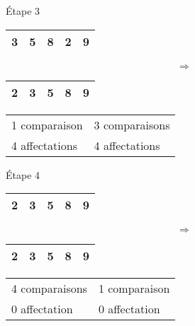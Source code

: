 \documentclass[10pt,fleqn]{article} %
\begin{document}
\begin{minipage}[b]{.1\linewidth}
Étape 3
\end{minipage}\hfill
\begin{minipage}[b]{.2\linewidth}
\begin{tabular}{|c|c|c|c|c|}
\hline
\cellcolor{black!10}3 & \cellcolor{black!10}5 & \cellcolor{black!10}8 & \cellcolor{black!30}2 & 9 \\
\hline
\end{tabular}
\end{minipage}\hfill
\begin{minipage}[b]{.1\linewidth}
$$
\Longrightarrow
$$
\end{minipage}\hfill
\begin{minipage}[b]{.2\linewidth}
\begin{tabular}{|c|c|c|c|c|}
\hline
\cellcolor{black!30}2 & \cellcolor{black!10}3 & \cellcolor{black!10}5 & \cellcolor{black!10}8 & 9 \\
\hline
\end{tabular}
\end{minipage}\hfill
\begin{minipage}[b]{.2\linewidth}
\begin{tabular}{ll}
1 comparaison & 3 comparaisons \\
4 affectations & 4 affectations \\
\end{tabular}
\end{minipage}


\begin{minipage}[b]{.1\linewidth}
Étape 4
\end{minipage}\hfill
\begin{minipage}[b]{.2\linewidth}
\begin{tabular}{|c|c|c|c|c|}
\hline
\cellcolor{black!10}2 & \cellcolor{black!10}3 & \cellcolor{black!10}5 & \cellcolor{black!10}8 & \cellcolor{black!30}9 \\
\hline
\end{tabular}
\end{minipage}\hfill
\begin{minipage}[b]{.1\linewidth}
$$
\Longrightarrow
$$
\end{minipage}\hfill
\begin{minipage}[b]{.2\linewidth}
\begin{tabular}{|c|c|c|c|c|}
\hline
\cellcolor{black!10}2 & \cellcolor{black!10}3 & \cellcolor{black!10}5 & \cellcolor{black!10}8 & \cellcolor{black!30}9 \\
\hline
\end{tabular}
\end{minipage}\hfill
\begin{minipage}[b]{.2\linewidth}
\begin{tabular}{ll}
4 comparaisons & 1 comparaison \\
0 affectation & 0 affectation \\
\end{tabular}
\end{minipage}
\end{document}
